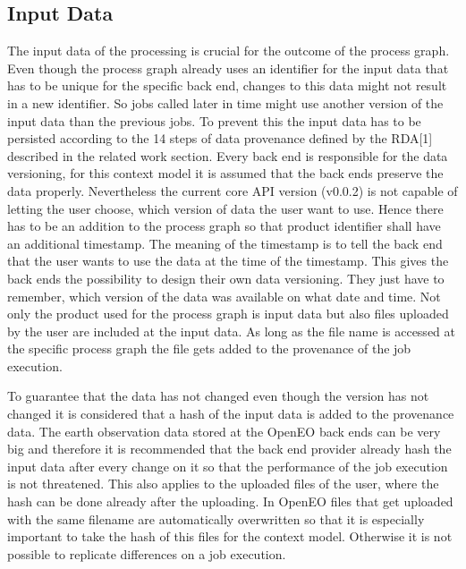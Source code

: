 \documentclass[draft,final]{vutinfth} %
\begin{document}
\subsection{Input Data}
The input data of the processing is crucial for the outcome of the process graph. Even though the process graph already uses an identifier for the input data that has to be unique for the specific back end, changes to this data might not result in a new identifier. So jobs called later in time might use another version of the input data than the previous jobs. To prevent this the input data has to be persisted according to the 14 steps of data provenance defined by the RDA[1] described in the related work section. Every back end is responsible for the data versioning, for this context model it is assumed that the back ends preserve the data properly. Nevertheless the current core API version (v0.0.2) is not capable of letting the user choose, which version of data the user want to use. Hence there has to be an addition to the process graph so that product identifier shall have an additional timestamp. The meaning of the timestamp is to tell the back end that the user wants to use the data at the time of the timestamp. This gives the back ends the possibility to design their own data versioning. They just have to remember, which version of the data was available on what date and time. 
Not only the product used for the process graph is input data but also files uploaded by the user are included at the input data. As long as the file name is accessed at the specific process graph the file gets added to the provenance of the job execution. 

To guarantee that the data has not changed even though the version has not changed it is considered that a hash of the input data is added to the provenance data. The earth observation data stored at the OpenEO back ends can be very big and therefore it is recommended that the back end provider already hash the input data after every change on it so that the performance of the job execution is not threatened. This also applies to the uploaded files of the user, where the hash can be done already after the uploading. In OpenEO files that get uploaded with the same filename are automatically overwritten so that it is especially important to take the hash of this files for the context model. Otherwise it is not possible to replicate differences on a job execution. 
\end{document}
